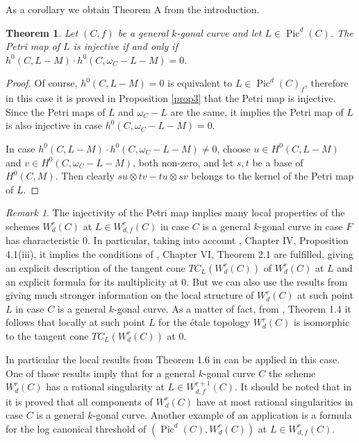 \documentclass{article}
\DeclareMathOperator{\Pic}{Pic}
\newtheorem{theorem}{Theorem}
\theoremstyle{definition}
\theoremstyle{remark}
\newtheorem{remark}{Remark}
\begin{document}
As a corollary we obtain Theorem A from the introduction.

\begin{theorem}\label{TheoA}
Let $(C,f)$ be a general $k$-gonal curve and let $L\in \Pic^d(C)$.
The Petri map of $L$ is injective if and only if $h^0(C,L-M)\cdot h^0(C,\omega _C-L-M)=0$.
\end{theorem}
\begin{proof}
Of course, $h^0(C,L-M)=0$ is equivalent to $L \in \Pic^d(C)_f$, therefore in this case it is proved in Proposition \ref{prop3} that the Petri map is injective.
Since the Petri maps of $L$ and $\omega_C-L$ are the same, it implies the Petri map of $L$ is also injective in case $h^0(C,\omega_C-L-M)=0$.

In case $h^0(C,L-M)\cdot h^0(C,\omega _C-L-M) \neq 0$, choose $u \in H^0(C,L-M)$ and $v \in H^0(C,\omega _C-L-M)$, both non-zero, and let $s, t$ be a base of $H^0(C,M)$.
Then clearly $su\otimes tv-tu \otimes sv$ belongs to the kernel of the Petri map of $L$.
\end{proof}

\begin{remark}\label{rem1}
The injectivity of the Petri map implies many local properties of the schemes $W^r_d(C)$ at $L \in W^r_{d,f}(C)$ in case $C$ is a general $k$-gonal curve in case $F$ has characteristic 0.
In particular, taking into account \cite{ref9}, Chapter IV, Proposition 4.1(iii), it implies the conditions of \cite{ref9}, Chapter VI, Theorem 2.1 are fulfilled, giving an explicit description of the tangent cone $TC_L(W^r_d(C))$ of $W^r_d(C)$ at $L$ and an explicit formula for its multiplicity at $0$.
But we can also use the results from \cite{ref16} giving much stronger information on the local structure of $W^r_d(C)$ at such point $L$ in case $C$ is a general $k$-gonal curve.
As a matter of fact, from \cite{ref16}, Theorem 1.4 it follows that locally at such point $L$ for the étale topology $W^r_d(C)$ is isomorphic to the tangent cone $TC_L(W^r_d(C))$ at $0$.

In particular the local results from Theorem 1.6 in \cite{ref16} can be applied in this case.
One of those results imply that for a general $k$-gonal curve $C$ the scheme $W^r_d(C)$ has a rational singularity at $L \in W^{r+1}_{d,f}(C)$.
It should be noted that in \cite{ref3} it is proved that all components of $W^r_d(C)$ have at most rational singularities in case $C$ is a general $k$-gonal curve.
Another example of an application is a formula for the log canonical threshold of $(\Pic ^d(C), W^r_d(C))$ at $L \in W^r_{d,f}(C)$.
\end{remark}
\end{document}
